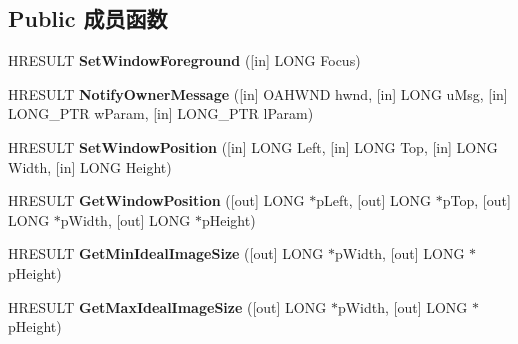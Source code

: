 \subsection*{Public 成员函数}
\begin{DoxyCompactItemize}
\item 
\mbox{\label{interface_quartz_type_lib_1_1_i_video_window_a519b6bdd117448032cd7c9524623fad0}} 
H\+R\+E\+S\+U\+LT {\bfseries Set\+Window\+Foreground} (\mbox{[}in\mbox{]} L\+O\+NG Focus)
\item 
\mbox{\label{interface_quartz_type_lib_1_1_i_video_window_a37735e2be8c636caba4b23d563c16cb5}} 
H\+R\+E\+S\+U\+LT {\bfseries Notify\+Owner\+Message} (\mbox{[}in\mbox{]} O\+A\+H\+W\+ND hwnd, \mbox{[}in\mbox{]} L\+O\+NG u\+Msg, \mbox{[}in\mbox{]} L\+O\+N\+G\+\_\+\+P\+TR w\+Param, \mbox{[}in\mbox{]} L\+O\+N\+G\+\_\+\+P\+TR l\+Param)
\item 
\mbox{\label{interface_quartz_type_lib_1_1_i_video_window_a0da26118052b293d1abcf1a85684f4e0}} 
H\+R\+E\+S\+U\+LT {\bfseries Set\+Window\+Position} (\mbox{[}in\mbox{]} L\+O\+NG Left, \mbox{[}in\mbox{]} L\+O\+NG Top, \mbox{[}in\mbox{]} L\+O\+NG Width, \mbox{[}in\mbox{]} L\+O\+NG Height)
\item 
\mbox{\label{interface_quartz_type_lib_1_1_i_video_window_a4cdef650b3947195276808befac58baa}} 
H\+R\+E\+S\+U\+LT {\bfseries Get\+Window\+Position} (\mbox{[}out\mbox{]} L\+O\+NG $\ast$p\+Left, \mbox{[}out\mbox{]} L\+O\+NG $\ast$p\+Top, \mbox{[}out\mbox{]} L\+O\+NG $\ast$p\+Width, \mbox{[}out\mbox{]} L\+O\+NG $\ast$p\+Height)
\item 
\mbox{\label{interface_quartz_type_lib_1_1_i_video_window_adcfe42936dd06be59cc2fac3fa5f3709}} 
H\+R\+E\+S\+U\+LT {\bfseries Get\+Min\+Ideal\+Image\+Size} (\mbox{[}out\mbox{]} L\+O\+NG $\ast$p\+Width, \mbox{[}out\mbox{]} L\+O\+NG $\ast$p\+Height)
\item 
\mbox{\label{interface_quartz_type_lib_1_1_i_video_window_a849337daf0dcf11052691a5753ae9b25}} 
H\+R\+E\+S\+U\+LT {\bfseries Get\+Max\+Ideal\+Image\+Size} (\mbox{[}out\mbox{]} L\+O\+NG $\ast$p\+Width, \mbox{[}out\mbox{]} L\+O\+NG $\ast$p\+Height)

\end{DoxyCompactItemize}

